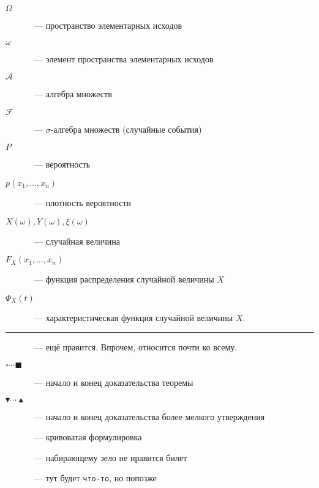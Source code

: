\documentclass[12pt]{../../notes}
\begin{document}
\begin{description}
  \item[$\Omega$]~--- пространство элементарных исходов
  \item[$\omega$]~--- элемент пространства элементарных исходов
  \item[$\mathcal A$]~--- алгебра множеств 
  \item[$\mathcal F$]~--- $\sigma$-алгебра множеств (случайные события)
  \item[$P$]~--- вероятность
  \item[$p(x_1, \dotsc, x_n)$]~--- плотность вероятности
  \item[$X(\omega), Y(\omega), \xi(\omega)$]~--- случайная величина
  \item[$F_X(x_1, \dotsc, x_n)$]~--- функция распределения случайной величины $X$
  \item[$\Phi_X(t)$]~--- характеристическая функция случайной величины $X$.
\end{description}

\noindent\rule{\textwidth}{0.01em}

\begin{description}
  \item[\underdev]~--- ещё правится. Впрочем, относится почти ко всему.
  \item[$\square\cdots\blacksquare$]~--- начало и конец доказательства теоремы
  \item[$\blacktriangledown\cdots\blacktriangle$]~--- начало и конец доказательства более мелкого 
    утверждения
  \item[\sour]~--- кривоватая формулировка
  \item[\flame]~--- набирающему зело не нравится билет
  \item[]~--- тут будет \texttt{что-то}, но попозже
\end{description}
\end{document}
